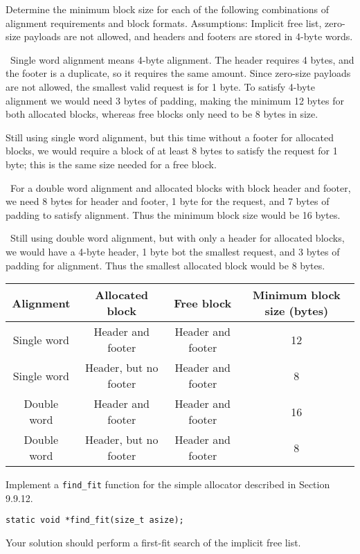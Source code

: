 \documentclass[12pt]{article}
\newenvironment{ex}[2][Exercise]{\begin{trivlist}
		\item[\hskip \labelsep {\bfseries #1}\hskip \labelsep {\bfseries #2.}]}{\end{trivlist}}
\newenvironment{sol}[1][Solution]{\begin{trivlist}
		\item[\hskip \labelsep {\bfseries #1:}]}{\end{trivlist}}
\begin{document}
\begin{ex}{9.7}
	Determine the minimum block size for each of the following combinations of alignment
	requirements and block formats. Assumptions: Implicit free list, zero-size payloads
	are not allowed, and headers and footers are stored in 4-byte words.
\end{ex}

\begin{sol}
	\
	Single word alignment means 4-byte alignment. The header requires 4 bytes, and the
	footer is a duplicate, so it requires the same amount. Since zero-size payloads
	are not allowed, the smallest valid request is for 1 byte. To satisfy 4-byte alignment
	we would need 3 bytes of padding, making the minimum 12 bytes for both allocated
	blocks, whereas free blocks only need to be 8 bytes in size.
	
	Still using single word alignment, but this time without a footer for allocated blocks,
	we would require a block of at least 8 bytes to satisfy the request for 1 byte;
	this is the same size needed for a free block.
	
	\
	For a double word alignment and allocated blocks with block header and footer, we need
	8 bytes for header and footer, 1 byte for the request, and 7 bytes of padding to
	satisfy alignment. Thus the minimum block size would be 16 bytes.
	
	\
	Still using double word alignment, but with only a header for allocated blocks, we
	would have a 4-byte header, 1 byte bot the smallest request, and 3 bytes of padding
	for alignment. Thus the smallest allocated block would be 8 bytes.
	\begin{center}
		\begin{tabular}{cccc}
			Alignment & Allocated block & Free block & Minimum block size (bytes)\\
			\hline
			Single word & Header and footer & Header and footer & 12\\
			Single word & Header, but no footer & Header and footer & 8\\
			Double word & Header and footer & Header and footer & 16\\
			Double word & Header, but no footer & Header and footer & 8\\
		\end{tabular}
	\end{center}
\end{sol}

\begin{ex}{9.8}
	Implement a \texttt{find\_fit} function for the simple allocator described in Section 9.9.12.
	\begin{lstlisting}
static void *find_fit(size_t asize);
	\end{lstlisting}
	Your solution should perform a first-fit search of the implicit free list.
\end{ex}
\end{document}
